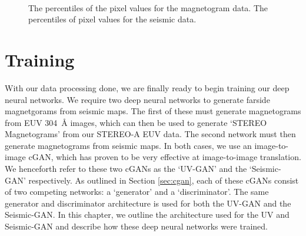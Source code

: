\documentclass[11pt,a4paper,onecolumn]{report}
\begin{document}
\begin{figure}[t]%
  \\
  \caption[]{ The percentiles of the pixel values for
  the magnetogram data.  The percentiles of pixel
  values for the seismic data.}
  \label{fig:hmi_seismic_p}
\end{figure}


%
%
%
%
%
%
%
%
\chapter{Training}
\label{chap:training}
%
%
%
%
%
%
%
%
With our data processing done, we are finally ready to begin training our deep
neural networks.
We require two deep neural networks to generate farside magnetgorams from
seismic maps. The first of these must generate magnetograms from EUV
\SI{304}{\angstrom} images, which can then be used to generate `STEREO
Magnetograms' from our STEREO-A EUV data. The second network must then generate
magnetograms from seismic maps. In both cases, we use an image-to-image cGAN,
which has proven to be very effective at image-to-image translation. We
henceforth refer to these two cGANs as the `UV-GAN' and the `Seismic-GAN'
respectively. As outlined in Section \ref{sec:cgan}, each of these cGANs consist
of two competing networks: a `generator' and a `discriminator'. The same
generator and discriminator architecture is used for both the UV-GAN and the
Seismic-GAN. In this chapter, we outline the architecture used for the UV and
Seismic-GAN and describe how these deep neural networks were trained.
\end{document}
